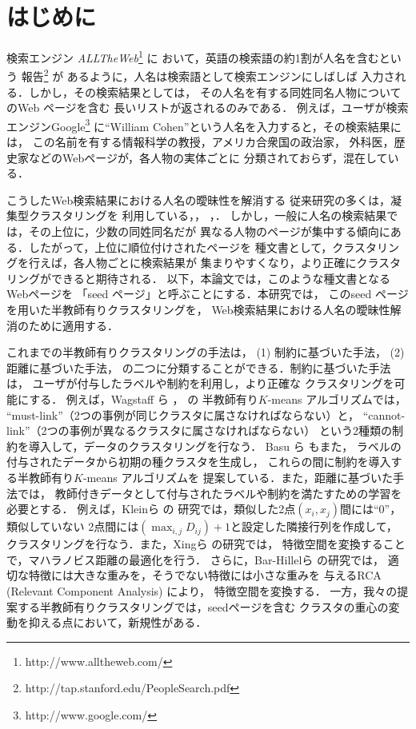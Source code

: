 \documentclass[japanese]{jnlp_1.4}
\begin{document}
\maketitle


\section{はじめに} \label{sec:Intro}

検索エンジン
\textit{ALLTheWeb}\footnote{http://www.alltheweb.com/} に
おいて，英語の検索語の約1割が人名を含むという
報告\footnote{http://tap.stanford.edu/PeopleSearch.pdf} が
あるように，人名は検索語として検索エンジンにしばしば
入力される．しかし，その検索結果としては，
その人名を有する同姓同名人物についてのWeb ページを含む
長いリストが返されるのみである．
例えば，ユーザが検索エンジンGoogle\footnote{http://www.google.com/} 
に``William Cohen''という人名を入力すると，その検索結果には，
この名前を有する情報科学の教授，アメリカ合衆国の政治家，
外科医，歴史家などのWebページが，各人物の実体ごとに
分類されておらず，混在している．

こうしたWeb検索結果における人名の曖昧性を解消する
従来研究の多くは，凝集型クラスタリングを
利用している\cite{Mann03}，\cite{Pedersen05}，
\cite{Bekkerman-ICML05}，\cite{Bollegala06}．
しかし，一般に人名の検索結果では，その上位に，少数の同姓同名だが
異なる人物のページが集中する傾向にある．したがって，上位に順位付けされたページを
種文書として，クラスタリングを行えば，各人物ごとに検索結果が
集まりやすくなり，より正確にクラスタリングができると期待される．
以下，本論文では，このような種文書となるWebページを
「seed ページ」と呼ぶことにする．本研究では，
このseed ページを用いた半教師有りクラスタリングを，
Web検索結果における人名の曖昧性解消のために適用する．

これまでの半教師有りクラスタリングの手法は，
(1) 制約に基づいた手法，
(2) 距離に基づいた手法，
の二つに分類することができる．制約に基づいた手法は，
ユーザが付与したラベルや制約を利用し，より正確な
クラスタリングを可能にする．
例えば，Wagstaff ら \cite{Wagstaff00}，\cite{Wagstaff01} の
半教師有り$K$-means アルゴリズムでは，
``must-link''（2つの事例が同じクラスタに属さなければならない）と，
``cannot-link''（2つの事例が異なるクラスタに属さなければならない）
という2種類の制約を導入して，データのクラスタリングを行なう．
Basu ら \cite{Basu02} もまた，
ラベルの付与されたデータから初期の種クラスタを生成し，
これらの間に制約を導入する半教師有り$K$-means アルゴリズムを
提案している．また，距離に基づいた手法では，
教師付きデータとして付与されたラベルや制約を満たすための学習を必要とする．
例えば，Kleinら \cite{Klein02} の
研究では，類似した2点$(x_{i},x_{j})$間には``0''，類似していない
2点間には$(\max_{i,j} D_{ij})+1$と設定した隣接行列を作成して，
クラスタリングを行なう．また，Xingら \cite{Xing03} の研究では，
特徴空間を変換することで，マハラノビス距離の最適化を行う．
さらに，Bar-Hillelら \cite{Bar-Hillel03} の研究では，
適切な特徴には大きな重みを，そうでない特徴には小さな重みを
与えるRCA (Relevant Component Analysis) \cite{Shental02} により，
特徴空間を変換する．
一方，我々の提案する半教師有りクラスタリングでは，seedページを含む
クラスタの重心の変動を抑える点において，新規性がある．
\end{document}
